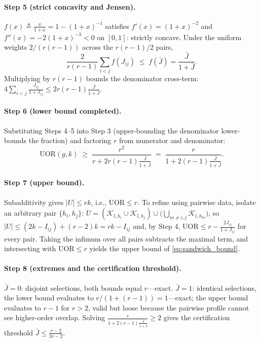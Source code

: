 \documentclass[final,5p,times,twocolumn]{elsarticle}
\theoremstyle{definition}
\theoremstyle{remark}
\newcommand{\UOR}{\mathrm{UOR}}
\newcommand{\TokSet}[1]{\mathcal{K}_{l,#1}}
\begin{document}
\paragraph{Step 5 (strict concavity and Jensen).}
 $f(x) \triangleq \frac{x}{1+x} = 1 - (1+x)^{-1}$ satisfies
 $f'(x) = (1+x)^{-2}$ and $f''(x) = -2(1+x)^{-3} < 0$ on $[0,1]$:
strictly concave. Under the uniform weights $2/(r(r-1))$ across the
 $r(r-1)/2$ pairs,
\[
  \frac{2}{r(r-1)}\sum_{i<j} f(J_{ij})
  \;\le\; f(\bar J) = \frac{\bar J}{1+\bar J}.
\]
Multiplying by $r(r-1)$ bounds the denominator cross-term:
 $4\sum_{i<j}\frac{J_{ij}}{1+J_{ij}} \le 2r(r-1)\frac{\bar J}{1+\bar J}$.

\paragraph{Step 6 (lower bound completed).}
Substituting Steps 4--5 into Step 3 (upper-bounding the denominator
lower-bounds the fraction) and factoring $r$ from numerator and
denominator:
\[
  \UOR(g,k) \;\ge\; \frac{r^{2}}{r + 2r(r-1)\frac{\bar J}{1+\bar J}}
  \;=\; \frac{r}{1 + 2(r-1)\frac{\bar J}{1+\bar J}}.
\]

\paragraph{Step 7 (upper bound).}
Subadditivity gives $|U| \le rk$, i.e., $\UOR \le r$. To refine using
pairwise data, isolate an arbitrary pair $\{h_i,h_j\}$:
 $U = (\TokSet{h_i}\cup\TokSet{h_j}) \cup
\bigl(\bigcup_{m\neq i,j}\TokSet{h_m}\bigr)$, so
 $|U| \le (2k - I_{ij}) + (r-2)k = rk - I_{ij}$ and, by Step 4,
 $\UOR \le r - \frac{2J_{ij}}{1+J_{ij}}$ for every pair. Taking the
infimum over all pairs subtracts the maximal term, and intersecting
with $\UOR \le r$ yields the upper bound of \cref{eq:sandwich_bound}.

\paragraph{Step 8 (extremes and the certification threshold).}
 $\bar J = 0$: disjoint selections, both bounds equal $r$---exact.
 $\bar J = 1$: identical selections, the lower bound evaluates to
 $r/(1 + (r-1)) = 1$---exact; the upper bound evaluates to $r-1$ for
 $r>2$, valid but loose because the pairwise profile cannot see
higher-order overlap. Solving
 $\frac{r}{1+2(r-1)\frac{\bar J}{1+\bar J}} \ge 2$ gives the
certification threshold $\bar J \le \frac{r-2}{3r-2}$.
\end{document}
